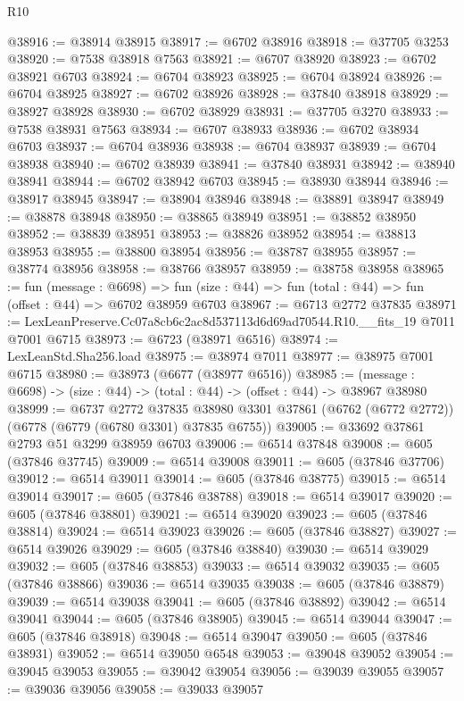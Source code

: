 \begin{lexlean}{R10}
\begin{coremodule}
@38916 := @38914 @38915
@38917 := @6702 @38916
@38918 := @37705 @3253
@38920 := @7538 @38918 @7563
@38921 := @6707 @38920
@38923 := @6702 @38921 @6703
@38924 := @6704 @38923
@38925 := @6704 @38924
@38926 := @6704 @38925
@38927 := @6702 @38926
@38928 := @37840 @38918
@38929 := @38927 @38928
@38930 := @6702 @38929
@38931 := @37705 @3270
@38933 := @7538 @38931 @7563
@38934 := @6707 @38933
@38936 := @6702 @38934 @6703
@38937 := @6704 @38936
@38938 := @6704 @38937
@38939 := @6704 @38938
@38940 := @6702 @38939
@38941 := @37840 @38931
@38942 := @38940 @38941
@38944 := @6702 @38942 @6703
@38945 := @38930 @38944
@38946 := @38917 @38945
@38947 := @38904 @38946
@38948 := @38891 @38947
@38949 := @38878 @38948
@38950 := @38865 @38949
@38951 := @38852 @38950
@38952 := @38839 @38951
@38953 := @38826 @38952
@38954 := @38813 @38953
@38955 := @38800 @38954
@38956 := @38787 @38955
@38957 := @38774 @38956
@38958 := @38766 @38957
@38959 := @38758 @38958
@38965 := fun (message : @6698) =>
  fun (size : @44) => fun (total : @44) => fun (offset : @44) => @6702 @38959 @6703
@38967 := @6713 @2772 @37835
@38971 := LexLeanPreserve.Cc07a8cb6c2ac8d537113d6d69ad70544.R10.__fits_19 @7011 @7001 @6715
@38973 := @6723 (@38971 @6516)
@38974 := LexLeanStd.Sha256.load
@38975 := @38974 @7011
@38977 := @38975 @7001 @6715
@38980 := @38973 (@6677 (@38977 @6516))
@38985 := (message : @6698) -> (size : @44) -> (total : @44) -> (offset : @44) -> @38967 @38980
@38999 := @6737
    @2772
    @37835
    @38980
    @3301
    @37861
    (@6762 (@6772 @2772))
    (@6778 (@6779 (@6780 @3301) @37835 @6755))
@39005 := @33692 @37861 @2793 @51 @3299 @38959 @6703
@39006 := @6514 @37848
@39008 := @605 (@37846 @37745)
@39009 := @6514 @39008
@39011 := @605 (@37846 @37706)
@39012 := @6514 @39011
@39014 := @605 (@37846 @38775)
@39015 := @6514 @39014
@39017 := @605 (@37846 @38788)
@39018 := @6514 @39017
@39020 := @605 (@37846 @38801)
@39021 := @6514 @39020
@39023 := @605 (@37846 @38814)
@39024 := @6514 @39023
@39026 := @605 (@37846 @38827)
@39027 := @6514 @39026
@39029 := @605 (@37846 @38840)
@39030 := @6514 @39029
@39032 := @605 (@37846 @38853)
@39033 := @6514 @39032
@39035 := @605 (@37846 @38866)
@39036 := @6514 @39035
@39038 := @605 (@37846 @38879)
@39039 := @6514 @39038
@39041 := @605 (@37846 @38892)
@39042 := @6514 @39041
@39044 := @605 (@37846 @38905)
@39045 := @6514 @39044
@39047 := @605 (@37846 @38918)
@39048 := @6514 @39047
@39050 := @605 (@37846 @38931)
@39052 := @6514 @39050 @6548
@39053 := @39048 @39052
@39054 := @39045 @39053
@39055 := @39042 @39054
@39056 := @39039 @39055
@39057 := @39036 @39056
@39058 := @39033 @39057

\end{coremodule}
\end{lexlean}
